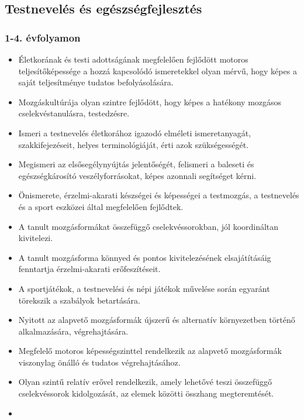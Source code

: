 \hypertarget{testneveles-es-egeszsegfejlesztes}{%
\subsection{Testnevelés és
egészségfejlesztés}\label{testneveles-es-egeszsegfejlesztes}}

\hypertarget{evfolyamon-33}{%
\subsubsection{1-4. évfolyamon}\label{evfolyamon-33}}

\begin{itemize}
\item
  Életkorának és testi adottságának megfelelően fejlődött motoros
  teljesítőképessége a hozzá kapcsolódó ismeretekkel olyan mérvű, hogy
  képes a saját teljesítménye tudatos befolyásolására.
\item
  Mozgáskultúrája olyan szintre fejlődött, hogy képes a hatékony
  mozgásos cselekvéstanulásra, testedzésre.
\item
  Ismeri a testnevelés életkorához igazodó elméleti ismeretanyagát,
  szakkifejezéseit, helyes terminológiáját, érti azok szükségességét.
\item
  Megismeri az elsősegélynyújtás jelentőségét, felismeri a baleseti és
  egészségkárosító veszélyforrásokat, képes azonnali segítséget kérni.
\item
  Önismerete, érzelmi-akarati készségei és képességei a testmozgás, a
  testnevelés és a sport eszközei által megfelelően fejlődtek.
\item
  A tanult mozgásformákat összefüggő cselekvéssorokban, jól koordináltan
  kivitelezi.
\item
  A tanult mozgásforma könnyed és pontos kivitelezésének elsajátításáig
  fenntartja érzelmi-akarati erőfeszítéseit.
\item
  A sportjátékok, a testnevelési és népi játékok művelése során egyaránt
  törekszik a szabályok betartására.
\item
  Nyitott az alapvető mozgásformák újszerű és alternatív környezetben
  történő alkalmazására, végrehajtására.
\item
  Megfelelő motoros képességszinttel rendelkezik az alapvető
  mozgásformák viszonylag önálló és tudatos végrehajtásához.
\item
  Olyan szintű relatív erővel rendelkezik, amely lehetővé teszi
  összefüggő cselekvéssorok kidolgozását, az elemek közötti összhang
  megteremtését.
\item

\end{itemize}
